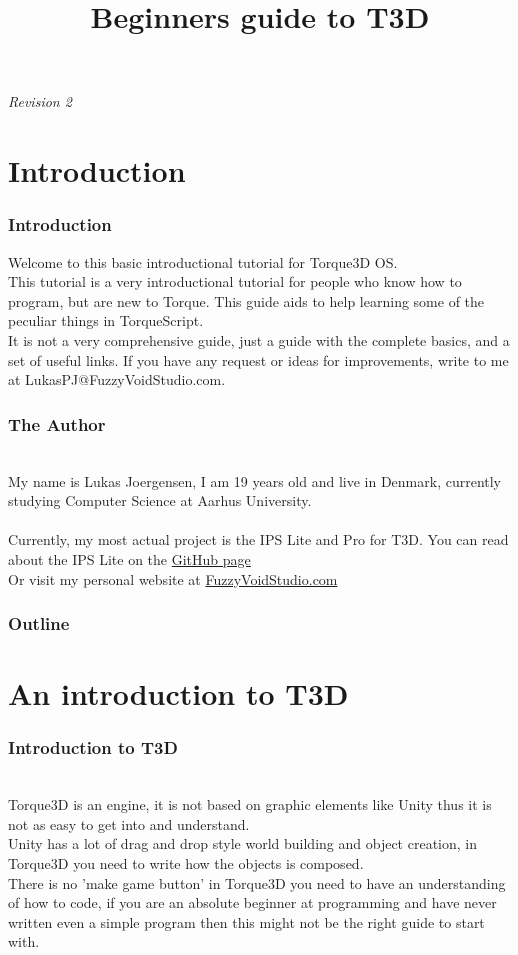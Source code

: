 
\title{Beginners guide to T3D}


\begin{frame}
\titlepage
{\it Revision 2}
\end{frame}
\section{Introduction}
\begin{frame}
\frametitle{Introduction}
	Welcome to this basic introductional tutorial for Torque3D OS.\\
	This tutorial is a very introductional tutorial for people who know how to program, but are new to Torque. This guide aids to help learning some of the peculiar things in TorqueScript.\\
	It is not a very comprehensive guide, just a guide with the complete basics, and a set of useful links. If you have any request or ideas for improvements, write to me at LukasPJ@FuzzyVoidStudio.com.
\end{frame}
\begin{frame}[fragile]
\frametitle{The Author}
	\\
	My name is Lukas Joergensen, I am 19 years old and live in Denmark, currently studying Computer Science at Aarhus University.\\
	\\
	Currently, my most actual project is the IPS Lite and Pro for T3D. You can read about the IPS Lite on the {\color{blue}\href{https://github.com/lukaspj/IPS-Lite-for-T3D}{GitHub page}}\\
	Or visit my personal website at {\color{blue}\href{http://fuzzyvoidstudio.com/}{FuzzyVoidStudio.com}}
\end{frame}
\begin{frame}
\frametitle{Outline}
\tableofcontents[]
\end{frame}
\section{An introduction to T3D}
\begin{frame}
	\frametitle{Introduction to T3D}
	\\
	Torque3D is an engine, it is not based on graphic elements like Unity thus it is not as easy to get into and understand.\\
	Unity has a lot of drag and drop style world building and object creation, in Torque3D you need to write how the objects is composed.\\
	There is no 'make game button' in Torque3D you need to have an understanding of how to code, 
	if you are an absolute beginner at programming and have never written even a simple program then this might not be the right guide to start with.\\
\end{frame}

